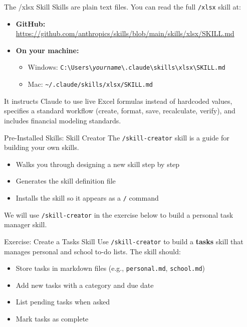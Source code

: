 \documentclass[aspectratio=169]{beamer}
\begin{document}
\begin{frame}{The /xlsx Skill}
Skills are plain text files.  You can read the full \texttt{/xlsx} skill at:
\vspace{0.3cm}
\begin{itemize}
  \item \textbf{GitHub:} \url{https://github.com/anthropics/skills/blob/main/skills/xlsx/SKILL.md}
  \item \textbf{On your machine:}
  \begin{itemize}\small
    \item Windows: \texttt{C:\textbackslash Users\textbackslash \textit{yourname}\textbackslash .claude\textbackslash skills\textbackslash xlsx\textbackslash SKILL.md}
    \item Mac: \texttt{\textasciitilde/.claude/skills/xlsx/SKILL.md}
  \end{itemize}
\end{itemize}
\vspace{0.3cm}
It instructs Claude to use \alert{live Excel formulas} instead of hardcoded values, specifies a standard workflow (create, format, save, recalculate, verify), and includes financial modeling standards.
\end{frame}

\begin{frame}{Pre-Installed Skills: Skill Creator}
The \texttt{/skill-creator} skill is a guide for \alert{building your own skills}.
\vspace{0.3cm}
\begin{itemize}\small
  \item Walks you through designing a new skill step by step
  \item Generates the skill definition file
  \item Installs the skill so it appears as a \texttt{/} command
\end{itemize}
\vspace{0.3cm}
We will use \texttt{/skill-creator} in the exercise below to build a personal task manager skill.
\end{frame}


\begin{frame}{Exercise: Create a Tasks Skill}
Use \texttt{/skill-creator} to build a \textbf{tasks} skill that manages personal and school to-do lists.  The skill should:
\vspace{0.3cm}
\begin{itemize}\small
  \item Store tasks in markdown files (e.g., \texttt{personal.md}, \texttt{school.md})
  \item Add new tasks with a category and due date
  \item List pending tasks when asked
  \item Mark tasks as complete
\end{itemize}
\end{frame}
\end{document}
